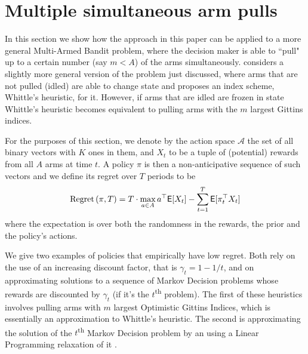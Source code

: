 \section{Multiple simultaneous arm pulls} \label{sec:multiple_pulls}
In this section we show how the approach in this paper can be applied to a more general Multi-Armed Bandit problem, where the decision maker is able to ``pull" up to a certain number (say $m < A$) of the arms simultaneously. \citep{whittle1988restless} considers a slightly more general version of the problem just discussed, where arms that are not pulled (idled) are able to change state and proposes an index scheme, Whittle's heuristic, for it. However, if arms that are idled are frozen in  state Whittle's heuristic becomes equivalent to pulling arms with the $m$ largest Gittins indices.

For the purposes of this section, we denote by the action space $\mathcal{A}$ the set of all binary vectors with $K$ ones in them, and $X_t$ to be a tuple of (potential) rewards from all $A$ arms at time $t$. A policy  $\pi$ is then a non-anticipative sequence of such vectors and we define its regret over $T$ periods to be
\[
\textnormal{Regret} \left( \pi, T \right) = T \cdot \max_{a \in A} a^\top \mathsf{E}[ X_t] - \sum_{t=1}^T \mathsf{E}[\pi_t^\top X_t ]
\]
where the expectation is over both the randomness in the rewards, the prior and the policy's actions.

We give two examples of policies that empirically have low regret. Both rely on the use of an increasing discount factor, that is $\gamma_t = 1 - 1/t$, and on approximating solutions to a sequence of Markov Decision problems whose rewards are discounted by $\gamma_t$ (if it's the $t$\textsuperscript{th} problem). The first of these heuristics involves pulling arms with $m$ largest Optimistic Gittins Indices, which is essentially an approximation to Whittle's heuristic. The second is approximating the solution of the $t$\textsuperscript{th} Markov Decision problem by an using a Linear Programming relaxation of it \citep{bertsimas1996conservation}.